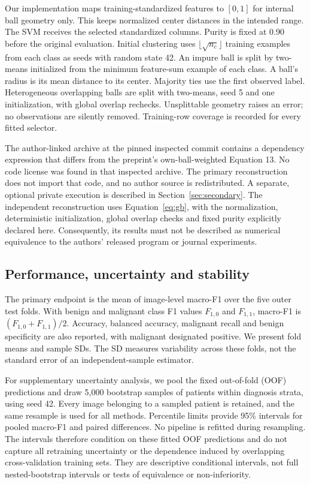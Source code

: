 \documentclass[11pt,a4paper]{article}
\begin{document}
Our implementation maps training-standardized features to $[0,1]$ for internal ball geometry only. This keeps normalized center distances in the intended range. The SVM receives the selected standardized columns. Purity is fixed at 0.90 before the original evaluation. Initial clustering uses $\lfloor\sqrt{n_c}\rfloor$ training examples from each class as seeds with random state 42. An impure ball is split by two-means initialized from the minimum feature-sum example of each class. A ball's radius is its mean distance to its center. Majority ties use the first observed label. Heterogeneous overlapping balls are split with two-means, seed 5 and one initialization, with global overlap rechecks. Unsplittable geometry raises an error; no observations are silently removed. Training-row coverage is recorded for every fitted selector.

The author-linked archive \cite{authorcode} at the pinned inspected commit contains a dependency expression that differs from the preprint's own-ball-weighted Equation 13. No code license was found in that inspected archive. The primary reconstruction does not import that code, and no author source is redistributed. A separate, optional private execution is described in Section~\ref{sec:secondary}. The independent reconstruction uses Equation~\ref{eq:gb}, with the normalization, deterministic initialization, global overlap checks and fixed purity explicitly declared here. Consequently, its results must not be described as numerical equivalence to the authors' released program or journal experiments.

\subsection{Performance, uncertainty and stability}
The primary endpoint is the mean of image-level macro-F1 over the five outer test folds. With benign and malignant class F1 values $F_{1,0}$ and $F_{1,1}$, macro-F1 is $(F_{1,0}+F_{1,1})/2$. Accuracy, balanced accuracy, malignant recall and benign specificity are also reported, with malignant designated positive. We present fold means and sample SDs. The SD measures variability across these folds, not the standard error of an independent-sample estimator.

For supplementary uncertainty analysis, we pool the fixed out-of-fold (OOF) predictions and draw 5,000 bootstrap samples of patients within diagnosis strata, using seed 42. Every image belonging to a sampled patient is retained, and the same resample is used for all methods. Percentile limits provide 95\% intervals for pooled macro-F1 and paired differences. No pipeline is refitted during resampling. The intervals therefore condition on these fitted OOF predictions and do not capture all retraining uncertainty or the dependence induced by overlapping cross-validation training sets. They are descriptive conditional intervals, not full nested-bootstrap intervals or tests of equivalence or non-inferiority.
\end{document}
